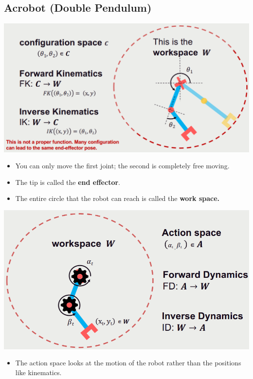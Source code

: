 \documentclass[10pt]{article}
\begin{document}
\subsection*{Acrobot (Double Pendulum)}
\begin{center} 
	\includegraphics*[width=\textwidth]{L2_6.png} 
\end{center}
\begin{itemize}
    \item You can only move the first joint; the second is completely free moving.
    \item The tip is called the \textbf{end effector}.
    \item The entire circle that the robot can reach is called the \textbf{work space.}
\end{itemize}
\begin{center} 
	\includegraphics*[width=\textwidth]{L2_7.png} 
\end{center}
\begin{itemize}
	\item The action space looks at the motion of the robot rather than the positions like kinematics.
\end{itemize}
\end{document}
